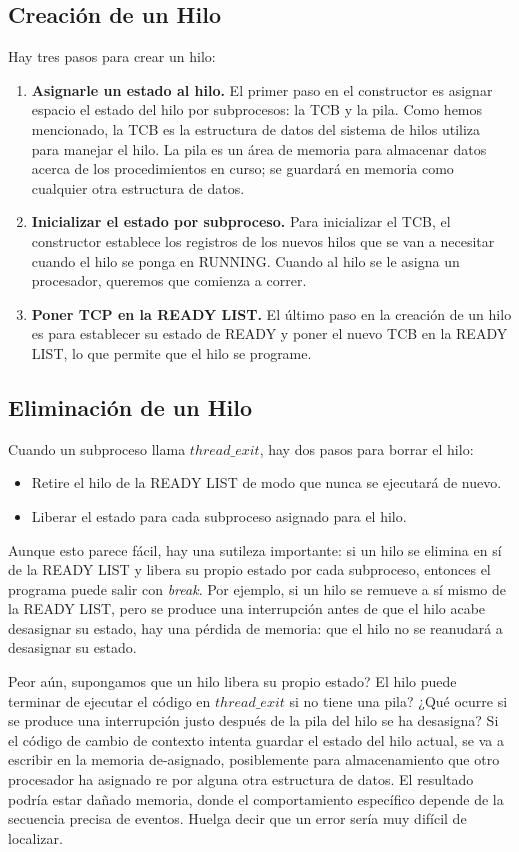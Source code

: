 \documentclass[10pt]{book}
\begin{document}
\subsection{Creación de un Hilo}
Hay tres pasos para crear un hilo:
\begin{enumerate}
\item \textbf{Asignarle un estado al hilo.} El primer paso en el constructor es asignar espacio el estado del hilo por subprocesos: la TCB y la pila. Como hemos mencionado, la TCB es la estructura de datos del sistema de hilos utiliza para manejar el hilo. La pila es un área de memoria para almacenar datos acerca de los procedimientos en curso; se guardará en memoria como cualquier otra estructura de datos.

\item \textbf{Inicializar el estado por subproceso.} Para inicializar el TCB, el constructor establece los registros de los nuevos hilos que se van a necesitar cuando el hilo se ponga en RUNNING. Cuando al hilo se le asigna un procesador, queremos que comienza a correr.

\item \textbf{Poner TCP en la READY LIST.} El último paso en la creación de un hilo es para establecer su estado de READY y poner el nuevo TCB en la READY LIST, lo que permite que el hilo se programe.
\end{enumerate}

\subsection{Eliminación de un Hilo}
Cuando un subproceso llama $thread\_ exit$, hay dos pasos para borrar el hilo:
\begin{itemize}
\item Retire el hilo de la READY LIST de modo que nunca se ejecutará de nuevo.
\item Liberar el estado para cada subproceso asignado para el hilo.
\end{itemize}

Aunque esto parece fácil, hay una sutileza importante: si un hilo se elimina en sí de la READY LIST y libera su propio estado por cada subproceso, entonces el programa puede salir con \textit{break}. Por ejemplo, si un hilo se remueve a sí mismo de la READY LIST, pero se produce una interrupción antes de que el hilo acabe desasignar su estado, hay una pérdida de memoria: que el hilo no se reanudará a desasignar su estado.

Peor aún, supongamos que un hilo libera su propio estado? El hilo puede terminar de ejecutar el código en $thread\_ exit$ si no tiene una pila? ¿Qué ocurre si se produce una interrupción justo después de la pila del hilo se ha desasigna? Si el código de cambio de contexto intenta guardar el estado del hilo actual, se va a escribir en la memoria de-asignado, posiblemente para almacenamiento que otro procesador ha asignado re por alguna otra estructura de datos. El resultado podría estar dañado memoria, donde el comportamiento específico depende de la secuencia precisa de eventos. Huelga decir que un error sería muy difícil de localizar.
\end{document}
